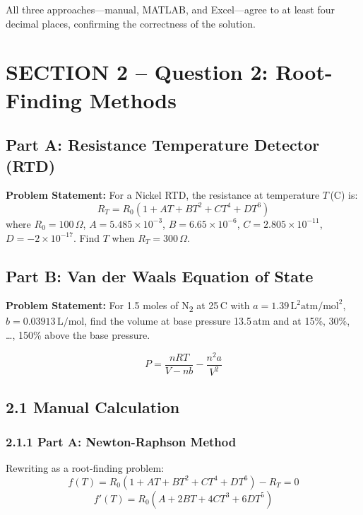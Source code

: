 \documentclass[12pt,a4paper]{article}
\begin{document}
All three approaches---manual, MATLAB, and Excel---agree to at least four decimal places,
confirming the correctness of the solution.

\newpage

\section{SECTION 2 -- Question 2: Root-Finding Methods}

\subsection*{Part A: Resistance Temperature Detector (RTD)}

\textbf{Problem Statement:} For a Nickel RTD, the resistance at temperature $T$\,(\textdegree C) is:
\[
R_T = R_0(1 + AT + BT^2 + CT^4 + DT^6)
\]
where $R_0 = 100\,\Omega$, $A = 5.485\times10^{-3}$, $B = 6.65\times10^{-6}$,
$C = 2.805\times10^{-11}$, $D = -2\times10^{-17}$.
Find $T$ when $R_T = 300\,\Omega$.

\subsection*{Part B: Van der Waals Equation of State}

\textbf{Problem Statement:} For 1.5 moles of N\textsubscript{2} at 25\,\textdegree C with $a = 1.39\,\text{L}^2\text{atm/mol}^2$,
$b = 0.03913\,\text{L/mol}$, find the volume at base pressure 13.5\,atm and at 15\%, 30\%, \ldots,
150\% above the base pressure.

\[
P = \frac{nRT}{V - nb} - \frac{n^2 a}{V^2}
\]

\subsection{2.1 Manual Calculation}

\subsubsection{2.1.1 Part A: Newton-Raphson Method}

Rewriting as a root-finding problem:
\[
f(T) = R_0(1 + AT + BT^2 + CT^4 + DT^6) - R_T = 0
\]
\[
f'(T) = R_0(A + 2BT + 4CT^3 + 6DT^5)
\]
\end{document}
